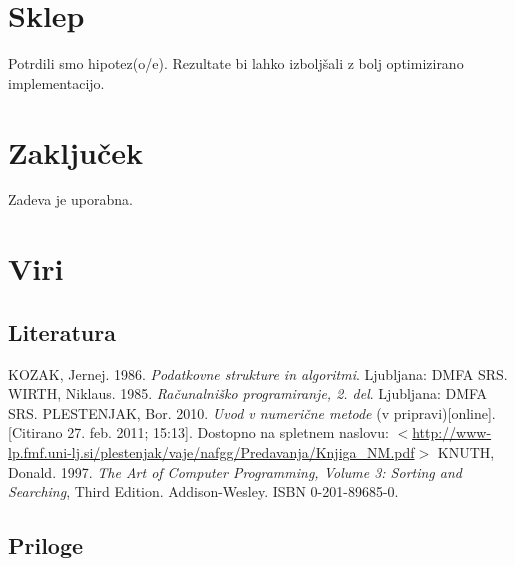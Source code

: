 \documentclass[a4paper,oneside,12pt]{article}
\begin{document}
\section{Sklep}
Potrdili smo hipotez(o/e). Rezultate bi lahko izboljšali z bolj optimizirano implementacijo.
\section{Zaključek}
Zadeva je uporabna.
\section{Viri}
\subsection{Literatura}
\vspace{-1cm}
\begin{thebibliography}{99}
   {KOZAK, Jernej. 1986. \emph{Podatkovne strukture in algoritmi}. Ljubljana: DMFA SRS. }
   {WIRTH, Niklaus. 1985. \emph{Računalniško programiranje, 2. del}. Ljubljana: DMFA SRS. }
   {PLESTENJAK, Bor. 2010. \emph{Uvod v numerične metode} (v pripravi)[online]. [Citirano 27. feb. 2011; 15:13].
    Dostopno na spletnem naslovu: $<$\url{http://www-lp.fmf.uni-lj.si/plestenjak/vaje/nafgg/Predavanja/Knjiga_NM.pdf}$>$}
   {KNUTH, Donald. 1997. \emph{The Art of Computer Programming, Volume 3: Sorting and
    Searching}, Third Edition. Addison-Wesley. ISBN 0-201-89685-0.}
\end{thebibliography}
\subsection{Priloge}
\end{document}
